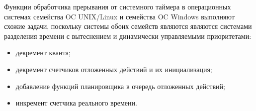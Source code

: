 Функции обработчика прерывания от системного таймера в операционных системах семейства OC UNIX/Linux и семейства OC Windows выполняют схожие задачи, поскольку системы обоих семейств являются являются системами разделения времени с вытеснением и динамически управляемыми приоритетами:

\begin{itemize}[label*=--]
	\item декремент кванта;
	\item декремент счетчиков отложенных действий и их инициализация;
	\item добавление функций планировщика в очередь отложенных действий;
	\item инкремент счетчика реального времени.  
\end{itemize}